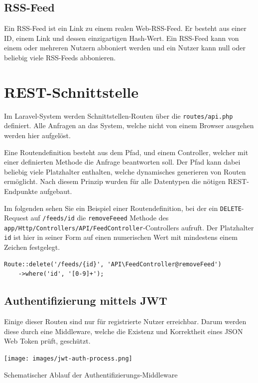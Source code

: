     \subsection{RSS-Feed}
        Ein RSS-Feed ist ein Link zu einem realen Web-RSS-Feed. Er besteht aus einer ID, einem Link und dessen einzigartigen Hash-Wert. Ein RSS-Feed kann von einem oder mehreren Nutzern abboniert werden und ein Nutzer kann null oder beliebig viele RSS-Feeds abbonieren.
    

\section{REST-Schnittstelle}

    Im Laravel-System werden Schnittstellen-Routen über die \texttt{routes/api.php} definiert. Alle Anfragen an das System, welche nicht von einem Browser ausgehen werden hier aufgelöst.
    
    Eine Routendefinition besteht aus dem Pfad, und einem Controller, welcher mit einer definierten Methode die Anfrage beantworten soll. Der Pfad kann dabei beliebig viele Platzhalter enthalten, welche dynamisches generieren von Routen ermöglicht. Nach diesem Prinzip wurden für alle Datentypen die nötigen REST-Endpunkte aufgebaut.
    
    Im folgenden sehen Sie ein Beispiel einer Routendefinition, bei der ein \texttt{DELETE}-Request auf \texttt{/feeds/{id}} die \texttt{removeFeeed} Methode des \texttt{app/Http/Controllers/API/FeedController}-Controllers aufruft. Der Platzhalter \texttt{{id}} ist hier in seiner Form auf einen numerischen Wert mit mindestens einem Zeichen festgelegt.

    \begin{lstlisting}
Route::delete('/feeds/{id}', 'API\FeedController@removeFeed')
    ->where('id', '[0-9]+');
    \end{lstlisting}
    
    \subsection{Authentifizierung mittels JWT}
        Einige dieser Routen sind nur für registrierte Nutzer erreichbar. Darum werden diese durch eine Middleware, welche die Existenz und Korrektheit eines JSON Web Token prüft, geschützt. 
        
        \begin{center}
            \texttt{[image: images/jwt-auth-process.png]}
            \caption{Schematischer Ablauf der Authentifizierungs-Middleware}
        \end{center}
        
